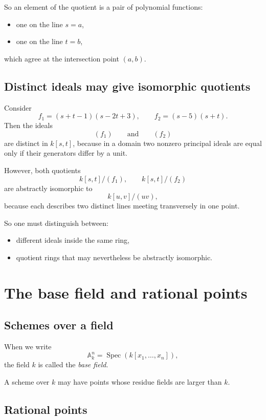 \documentclass[12pt,a4paper]{article}
\theoremstyle{notespace}
\newcommand{\Spec}{\operatorname{Spec}}
\newcommand{\A}{\mathbb A}
\theoremstyle{definition}
\begin{document}
	So an element of the quotient is a pair of polynomial functions:
	
	\begin{itemize}[leftmargin=2em]
		\item one on the line \(s=a\),
		\item one on the line \(t=b\),
	\end{itemize}
	
	which agree at the intersection point \((a,b)\).
	
	\subsection{Distinct ideals may give isomorphic quotients}
	
	Consider
	\[
	f_1=(s+t-1)(s-2t+3),
	\qquad
	f_2=(s-5)(s+t).
	\]
	Then the ideals
	\[
	(f_1)
	\qquad\text{and}\qquad
	(f_2)
	\]
	are distinct in \(k[s,t]\), because in a domain two nonzero principal ideals are equal only if their generators differ by a unit.
	
	However, both quotients
	\[
	k[s,t]/(f_1),
	\qquad
	k[s,t]/(f_2)
	\]
	are abstractly isomorphic to
	\[
	k[u,v]/(uv),
	\]
	because each describes two distinct lines meeting transversely in one point.
	
	So one must distinguish between:
	
	\begin{itemize}[leftmargin=2em]
		\item different ideals inside the same ring,
		\item quotient rings that may nevertheless be abstractly isomorphic.
	\end{itemize}
	
	\section{The base field and rational points}
	
	\subsection{Schemes over a field}
	
	When we write
	\[
	\A^n_k=\Spec(k[x_1,\dots,x_n]),
	\]
	the field \(k\) is called the \emph{base field}.
	
	A scheme over \(k\) may have points whose residue fields are larger than \(k\).
	
	\subsection{Rational points}
	
\end{document}
